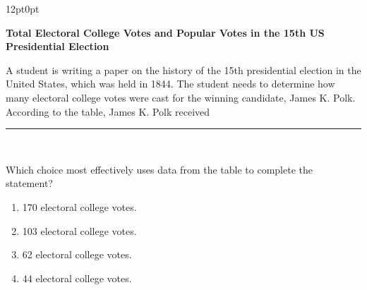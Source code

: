 \documentclass[11pt, twocolumn]{article}
\newcounter{questionnum}
\begin{document}
\vspace{6pt}\noindent
\begin{minipage}{\columnwidth}\raggedright
\noindent{}\par\vspace{8pt}
\begin{adjustwidth}{12pt}{0pt}
\begin{center}
\textbf{Total Electoral College Votes and Popular Votes in the 15th US Presidential Election}
\end{center}
\noindent{}

A student is writing a paper on the history of the 15th presidential election in the United States, which was held in 1844. The student needs to determine how many electoral college votes were cast for the winning candidate, James K. Polk. According to the table, James K. Polk received \,\rule{2cm}{0.4pt}\,
\vspace{6pt}

Which choice most effectively uses data from the table to complete the statement?
\begin{enumerate}[label=\Alph*),leftmargin=18pt,topsep=3pt,itemsep=2pt]
  \item 170 electoral college votes.
  \item 103 electoral college votes.
  \item 62 electoral college votes.
  \item 44 electoral college votes.
\end{enumerate}
\end{adjustwidth}
\end{minipage}\par
\end{document}
